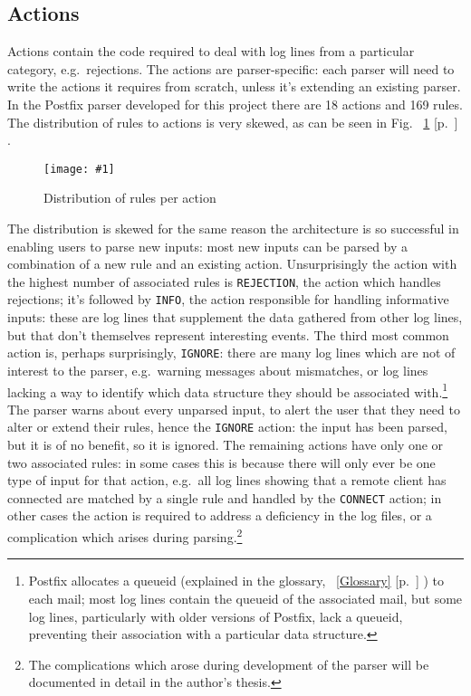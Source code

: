 \documentclass[draft]{svmult}
\newcommand{\showgraph}[3]{
    \begin{figure}[hbt!]
        \caption{#2}\label{#3}
        \texttt{[image: \#1]}
    \end{figure}
}
\newcommand{\refwithpage}[1]{%
    \empty{}\ref{#1} [p.~\pageref{#1}]%
}
\newcommand{\sectionref}[1]{%
    \textsection{}\refwithpage{#1}%
}
\newcommand{\numberOFrules}[0]{%
    169%
}
\newcommand{\numberOFactions}[0]{%
    18%
}
\begin{document}
\subsection{Actions}

\label{Actions}

Actions contain the code required to deal with log lines from a particular
category, e.g.\ rejections.  The actions are parser-specific: each parser
will need to write the actions it requires from scratch, unless it's
extending an existing parser.  In the Postfix parser developed for this
project there are \numberOFactions{} actions and \numberOFrules{} rules.
The distribution of rules to actions is very skewed, as can be seen in
Fig.~\refwithpage{Distribution of rules per action}.
\showgraph{build/plot-action-distribution}{Distribution of rules per
action}{Distribution of rules per action} The distribution is skewed for
the same reason the architecture is so successful in enabling users to
parse new inputs: most new inputs can be parsed by a combination of a new
rule and an existing action.  Unsurprisingly the action with the highest
number of associated rules is \texttt{REJECTION}, the action which handles
rejections; it's followed by \texttt{INFO}, the action responsible for
handling informative inputs: these are log lines that supplement the data
gathered from other log lines, but that don't themselves represent
interesting events.  The third most common action is, perhaps surprisingly,
\texttt{IGNORE}: there are many log lines which are not of interest to the
parser, e.g.\ warning messages about \DNS{} mismatches, or log lines
lacking a way to identify which data structure they should be associated
with.\footnote{Postfix allocates a queueid (explained in the
glossary,~\sectionref{Glossary}) to each mail; most log lines contain the
queueid of the associated mail, but some log lines, particularly with older
versions of Postfix, lack a queueid, preventing their association with a
particular data structure.}  The parser warns about every unparsed input,
to alert the user that they need to alter or extend their rules, hence the
\texttt{IGNORE} action: the input has been parsed, but it is of no benefit,
so it is ignored.  The remaining actions have only one or two associated
rules: in some cases this is because there will only ever be one type of
input for that action, e.g.\ all log lines showing that a remote client has
connected are matched by a single rule and handled by the \texttt{CONNECT}
action; in other cases the action is required to address a deficiency in
the log files, or a complication which arises during
parsing.\footnote{\label{complications footnote}The complications which
arose during development of the parser will be documented in detail in the
author's thesis.}
\end{document}
